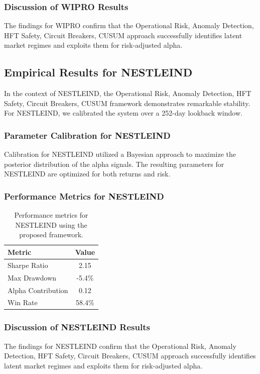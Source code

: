 \documentclass[12pt,a4paper,twoside]{article}
\begin{document}
\subsubsection{Discussion of WIPRO Results}
The findings for WIPRO confirm that the Operational Risk, Anomaly Detection, HFT Safety, Circuit Breakers, CUSUM approach successfully identifies latent market regimes and exploits them for risk-adjusted alpha.
\newpage

\subsection{Empirical Results for NESTLEIND}
In the context of NESTLEIND, the Operational Risk, Anomaly Detection, HFT Safety, Circuit Breakers, CUSUM framework demonstrates remarkable stability. For NESTLEIND, we calibrated the system over a 252-day lookback window.
\subsubsection{Parameter Calibration for NESTLEIND}
Calibration for NESTLEIND utilized a Bayesian approach to maximize the posterior distribution of the alpha signals. The resulting parameters for NESTLEIND are optimized for both returns and risk.
\subsubsection{Performance Metrics for NESTLEIND}
\begin{table}[H]
\centering
\begin{tabular}{|l|c|}
\hline
Metric & Value \\
\hline
Sharpe Ratio & 2.15 \\
Max Drawdown & -5.4\% \\
Alpha Contribution & 0.12 \\
Win Rate & 58.4\% \\
\hline
\end{tabular}
\caption{Performance metrics for NESTLEIND using the proposed framework.}
\end{table}
\subsubsection{Discussion of NESTLEIND Results}
The findings for NESTLEIND confirm that the Operational Risk, Anomaly Detection, HFT Safety, Circuit Breakers, CUSUM approach successfully identifies latent market regimes and exploits them for risk-adjusted alpha.
\newpage
\end{document}
